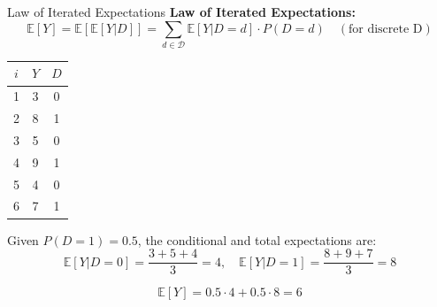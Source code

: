\documentclass[xcolor=svgnames,t]{beamer}
\begin{document}
\begin{frame}{Law of Iterated Expectations}
    \textbf{Law of Iterated Expectations:}
    \[
    \mathbb{E}[Y] = \mathbb{E}[\mathbb{E}[Y | D]] = \sum_{d \in \mathcal{D}} \mathbb{E}[Y | D = d] \cdot P(D = d) \quad (\text{for discrete D}) 
    \]
    

    
    \begin{table}[]
        \centering
        \begin{tabular}{|c|c|c|}
        \hline
        \( i \) & \( Y \) & \( D \) \\ \hline
        1 & 3  & 0 \\ \hline
        \rowcolor{blue!20} 2 & 8  & 1 \\ \hline
        3 & 5  & 0 \\ \hline
        \rowcolor{blue!20} 4 & 9  & 1 \\ \hline
        5 & 4  & 0 \\ \hline
        \rowcolor{blue!20} 6 & 7  & 1 \\ \hline
        \end{tabular}
        \end{table}
        
    
    \small{
        Given \( P(D = 1) = 0.5 \), the conditional and total expectations are:
        \[
        \mathbb{E}[Y | D = 0] = \frac{3 + 5 + 4}{3} = 4, \quad \mathbb{E}[Y | D = 1] = \frac{8 + 9 + 7}{3} = 8
        \]
        
         \[
        \mathbb{E}[Y] = 0.5 \cdot 4 + 0.5 \cdot 8 = 6
        \]
        }
\end{frame}
\end{document}
